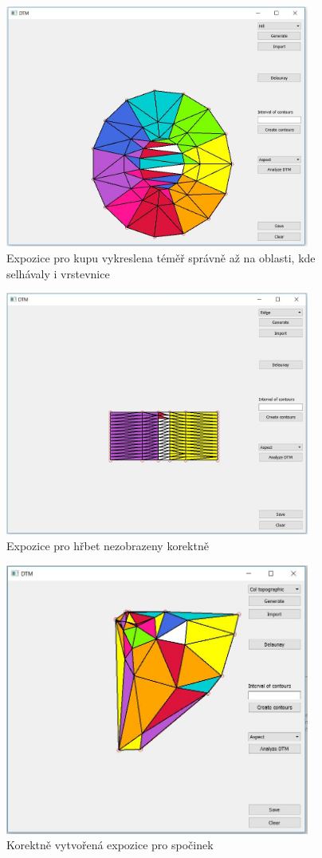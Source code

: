\documentclass[a4paper, 12pt]{article}
\begin{document}
\begin{figure}[h!]
\centering
\includegraphics[width=10cm]{pictures/hill_aspect.jpg}
\caption{Expozice pro kupu vykreslena téměř správně až na oblasti, kde selhávaly i vrstevnice}
\end{figure}

\begin{figure}[h!]
\centering
\includegraphics[width=10cm]{pictures/ridge_expozice.jpg}
\caption{Expozice pro hřbet nezobrazeny korektně}
\end{figure}

\begin{figure}[h!]
\centering
\includegraphics[width=10cm]{pictures/spocinek_expozice.jpg}
\caption{Korektně vytvořená expozice pro spočinek}
\end{figure}
\end{document}
